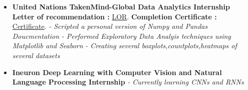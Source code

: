 \documentclass[a4paper,12pt]{article}
\begin{document}
\begin{itemize}
    \item{\textbf{\large{United Nations TakenMind-Global Data Analytics Internship}}
    \newline
    \textbf{Letter of recommendation :} \href{https://github.com/teetangh/Kaustav-All-Certifications/blob/master/Artificial%20Intelligence/UN%20Takenmind%20Data%20Analytics%20Internship/35799-KaustavGhosh-recommendation-letter.pdf}{LOR}.
    \textbf{Completion Certificate :} \href{https://github.com/teetangh/Kaustav-All-Certifications/blob/master/Artificial%20Intelligence/UN%20Takenmind%20Data%20Analytics%20Internship/35799-KaustavGhosh.pdf}{Certificate}.
    \newline
    \textit{- Scripted a personal version of Numpy and Pandas Doucmentation }
    \newline
    \textit{- Performed Exploratory Data Analyis techniques using Matplotlib and Seaborn }
    \newline
    \textit{- Creating several boxplots,countplots,heatmaps of several datasets}}
\end{itemize}
\begin{itemize}
    \item{\textbf{\large{Ineuron Deep Learning with Computer Vision and Natural Language Processing Internship}}
    \newline
    \textit{- Currently learning CNNs and RNNs }}
\end{itemize}



\pagebreak
\end{document}
